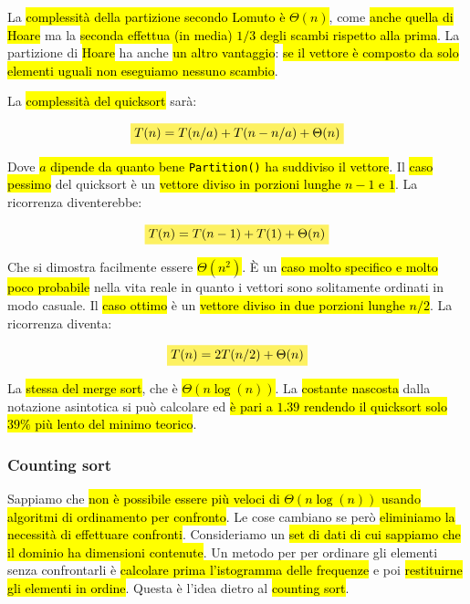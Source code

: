 \documentclass[a4paper,11pt,twoside]{article}
\theoremstyle{plain}
\theoremstyle{definition}
\theoremstyle{remark}
\newcommand{\mhl}[1]{\colorbox{hlcolor}{$\displaystyle #1$}}
\begin{document}
La \hl{complessità della partizione secondo Lomuto è $\Theta(n)$}, come
\hl{anche quella di Hoare} ma la \hl{seconda effettua (in media) $1/3$ degli
scambi rispetto alla prima}. La partizione di \hl{Hoare} ha anche \hl{un altro
vantaggio}: \hl{se il vettore è composto da solo elementi uguali non eseguiamo
nessuno scambio}.

La \hl{complessità del quicksort} sarà:

\begin{equation}
  \mhl{
    T(n) = T(n/a) + T(n - n/a) + \Theta(n)
  }
\end{equation}

Dove \hl{$a$ dipende da quanto bene \texttt{Partition()} ha suddiviso il
vettore}. Il \hl{caso pessimo} del quicksort è un \hl{vettore diviso in porzioni
lunghe $n-1$ e $1$}. La ricorrenza diventerebbe:

\begin{equation}
  \mhl{
    T(n) = T(n-1) + T(1) + \Theta(n)
  }
\end{equation}

Che si dimostra facilmente essere \hl{$\Theta(n^2)$}. È un \hl{caso molto
specifico e molto poco probabile} nella vita reale in quanto i vettori sono
solitamente ordinati in modo casuale. Il \hl{caso ottimo} è un \hl{vettore
diviso in due porzioni lunghe $n/2$}. La ricorrenza diventa:

\begin{equation}
  \mhl{
    T(n) = 2T(n/2) + \Theta(n)
  }
\end{equation}

La \hl{stessa del merge sort}, che è \hl{$\Theta(n\log(n))$}. La \hl{costante
nascosta} dalla notazione asintotica si può calcolare ed \hl{è pari a $1.39$
rendendo il quicksort solo $39\%$ più lento del minimo teorico}.

\subsubsection{Counting sort}\label{sec:counting-sort}

Sappiamo che \hl{non è possibile essere più veloci di $\Theta(n\log(n))$ usando
algoritmi di ordinamento per confronto}. Le cose cambiano se però \hl{eliminiamo
la necessità di effettuare confronti}. Consideriamo un \hl{set di dati di cui
sappiamo che il dominio ha dimensioni contenute}. Un metodo per per ordinare gli
elementi senza confrontarli è \hl{calcolare prima l'istogramma delle frequenze}
e poi \hl{restituirne gli elementi in ordine}. Questa è l'idea dietro al
\hl{counting sort}.
\end{document}
